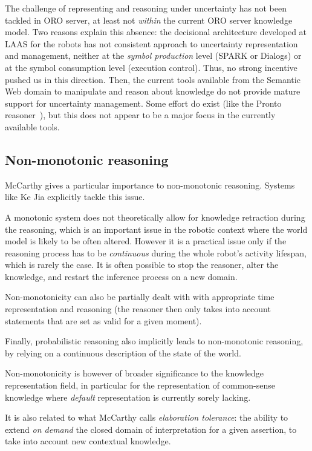 The challenge of representing and reasoning under uncertainty has not been
tackled in ORO server, at least not \emph{within} the current ORO server
knowledge model. Two reasons explain this absence: the decisional architecture
developed at LAAS for the robots has not consistent approach to uncertainty
representation and management, neither at the \emph{symbol production} level
(\ie SPARK or {\sc Dialogs}) or at the symbol consumption level (execution
control). Thus, no strong incentive pushed us in this direction. Then, the
current tools available from the Semantic Web domain to manipulate and reason
about knowledge do not provide mature support for uncertainty management. Some
effort do exist (like the {\sc Pronto} reasoner~\cite{Klinov2008}), but this
does not appear to be a major focus in the currently available tools.

\subsection{Non-monotonic reasoning}

McCarthy gives a particular importance to non-monotonic reasoning. Systems like
Ke Jia explicitly tackle this issue.

A monotonic system does not theoretically allow for knowledge retraction during
the reasoning, which is an important issue in the robotic context where the
world model is likely to be often altered.  However it is a practical issue
only if the reasoning process has to be \emph{continuous} during the whole
robot's activity lifespan, which is rarely the case. It is often possible to
stop the reasoner, alter the knowledge, and restart the inference process on a
new domain.

Non-monotonicity can also be partially dealt with with appropriate time
representation and reasoning (the reasoner then only takes into account
statements that are set as valid for a given moment).

Finally, probabilistic reasoning also implicitly leads to non-monotonic
reasoning, by relying on a continuous description of the state of the
world.

Non-monotonicity is however of broader significance to the knowledge
representation field, in particular for the representation of common-sense
knowledge where \emph{default} representation is currently sorely lacking.

It is also related to what McCarthy calls \emph{elaboration tolerance}: the
ability to extend \emph{on demand} the closed domain of interpretation for a
given assertion, to take into account new contextual knowledge.

